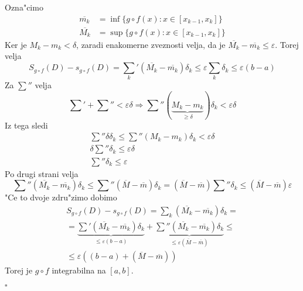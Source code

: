 Ozna"cimo
\begin{align*}
\overline{m_k} &= \inf \{g \circ f (x): x \in [x_{k-1}, x_k]\} \\
\overline{M_k} &= \sup \{g \circ f (x): x \in [x_{k-1}, x_k]\}
\end{align*}
Ker je $M_k - m_k < \delta$, zaradi enakomerne zveznosti velja, da je $\overline{M_k} - \overline{m_k} \leq \varepsilon$. Torej velja
\begin{equation*}
S_{g \circ f} (D) - s_{g \circ f}(D) = \sum_k'(\overline{M_k} - \overline{m_k}) \delta_k \leq \varepsilon \sum_k \delta_k \leq \varepsilon (b-a)
\end{equation*}
Za $\sum''$ velja
\begin{equation*}
\sum' + \sum'' < \varepsilon \delta \Rightarrow \sum'' (\underbrace{M_k - m_k}_{\geq \delta}) \delta_k < \varepsilon \delta
\end{equation*}
Iz tega sledi
\begin{gather*}
\sum'' \delta \delta_k \leq \sum'' (M_k - m_k) \delta_k < \varepsilon \delta \\
\delta \sum'' \delta_k \leq \varepsilon \delta \\
\sum '' \delta_k \leq \varepsilon
\end{gather*}
Po drugi strani velja
\begin{equation*}
\sum'' (\overline{M_k} - \overline{m_k}) \delta_k \leq \sum''(\overline{M} - \overline{m}) \delta_k = (\overline{M} - \overline{m}) \sum''\delta_k \leq (\overline{M} - \overline{m}) \varepsilon
\end{equation*}
"Ce to dvoje zdru"zimo dobimo
\begin{multline*}
S_{g \circ f}(D) - s_{g \circ f}(D) = \sum_k(\overline{M_k} - \overline{m_k}) \delta_k  = \\
= \underbrace{\sum' (\overline{M_k} - \overline{m_k}) \delta _k }_{\leq \varepsilon (b-a)} + \underbrace{\sum'' (\overline{M_k} - \overline{m_k}) \delta_k}_{\leq \varepsilon(\overline{M} - \overline{m})} \leq \\
\leq \varepsilon((b-a) + (\overline{M} - \overline{m}))
\end{multline*}
Torej je $g \circ f$ integrabilna na $[a, b]$.

\hfill $\square$
%
